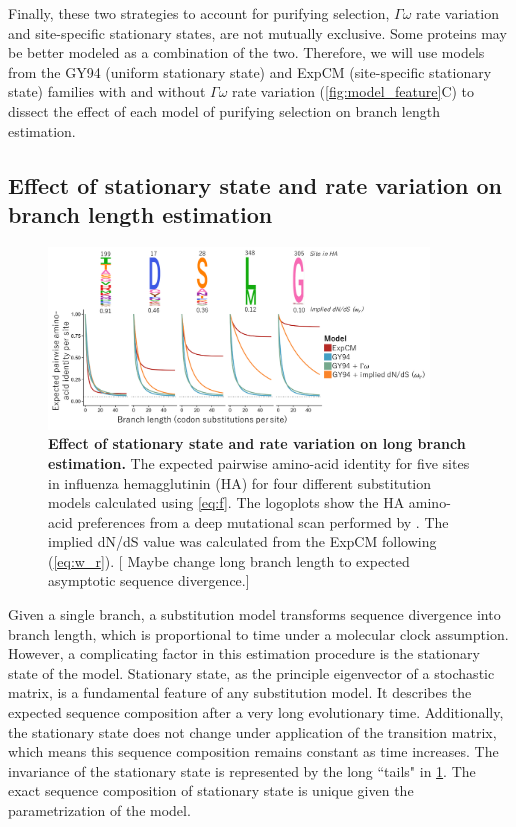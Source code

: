 \documentclass[11pt]{article}
\newcommand\skhcomment[1]{{\color{cyan}[#1]}}
\begin{document}
Finally, these two strategies to account for purifying selection, $\Gamma\omega$ rate variation and site-specific stationary states, are not mutually exclusive. 
Some proteins may be better modeled as a combination of the two. 
Therefore, we will use models from the GY94 (uniform stationary state) and ExpCM (site-specific stationary state) families with and without $\Gamma\omega$ rate variation (\ref{fig:model_feature}C) to dissect the effect of each model of purifying selection on branch length estimation. 

\subsection*{Effect of stationary state and rate variation on branch length estimation}

\begin{figure}[H]
\centerline{\includegraphics[width=0.90\textwidth]{figures/decay.pdf}}
\caption{\label{fig:decay}
\textbf{Effect of stationary state and rate variation on long branch estimation.}
The expected pairwise amino-acid identity for five sites in influenza hemagglutinin (HA) for four different substitution models calculated using \ref{eq:f}. 
The logoplots show the HA amino-acid preferences from a deep mutational scan performed by \cite{doud2016accurate}. 
The implied dN/dS value was calculated from the ExpCM following \cite{spielman2015relationship} (\ref{eq:w_r}).
\skhcomment{ Maybe change long branch length to expected asymptotic sequence divergence.}
}
\end{figure}

Given a single branch, a substitution model transforms sequence divergence into branch length, which is proportional to time under a molecular clock assumption. 
However, a complicating factor in this estimation procedure is the stationary state of the model. 
Stationary state, as the principle eigenvector of a stochastic matrix, is a fundamental feature of any substitution model. 
It describes the expected sequence composition after a very long evolutionary time. 
Additionally, the stationary state does not change under application of the transition matrix, which means this sequence composition remains constant as time increases. 
The invariance of the stationary state is represented by the long ``tails" in \ref{fig:decay}. 
The exact sequence composition of stationary state is unique given the parametrization of the model. 
\end{document}
